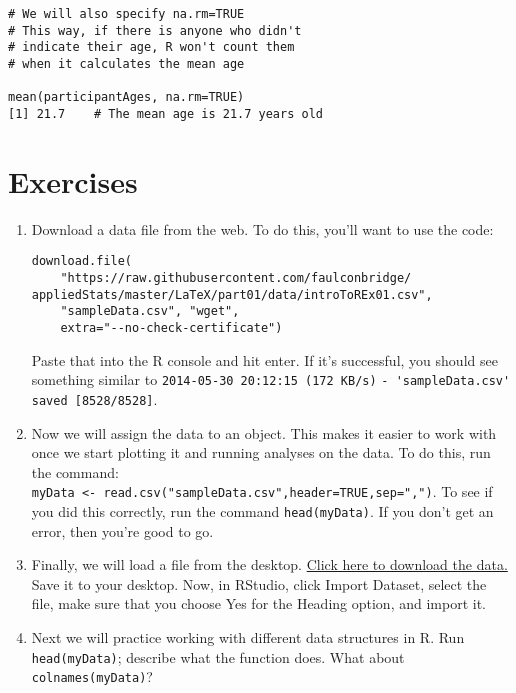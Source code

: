 \begin{framed}
\begin{Verbatim}[samepage=TRUE]
# We will also specify na.rm=TRUE
# This way, if there is anyone who didn't
# indicate their age, R won't count them
# when it calculates the mean age

mean(participantAges, na.rm=TRUE)
[1] 21.7    # The mean age is 21.7 years old
\end{Verbatim}
\end{framed}

\section{Exercises}

\begin{enumerate}
	\item Download a data file from the web. To do this, you'll want to use the code:
		\begin{framed}
		\begin{Verbatim}[samepage=TRUE]
download.file(
    "https://raw.githubusercontent.com/faulconbridge/
appliedStats/master/LaTeX/part01/data/introToREx01.csv",
    "sampleData.csv", "wget",
    extra="--no-check-certificate")
		\end{Verbatim}
		\end{framed}
	Paste that into the R console and hit enter. If it's successful, you should see something similar to \verb|2014-05-30 20:12:15 (172 KB/s)| \verb|- 'sampleData.csv' saved [8528/8528]|.
	
	\item Now we will assign the data to an object. This makes it easier to work with once we start plotting it and running analyses on the data. To do this, run the command: \\\verb|myData <- read.csv("sampleData.csv",header=TRUE,sep=",")|. To see if you did this correctly, run the command \verb|head(myData)|. If you don't get an error, then you're good to go.
	
	\item Finally, we will load a file from the desktop. \href{https://raw.githubusercontent.com/faulconbridge/appliedStats/master/LaTeX/part01/data/introToREx01.csv}{Click here to download the data.} Save it to your desktop. Now, in RStudio, click Import Dataset, select the file, make sure that you choose Yes for the Heading option, and import it.
	
	\item Next we will practice working with different data structures in R. Run \verb|head(myData)|; describe what the function does. What about \verb|colnames(myData)|?
	

\end{enumerate}
